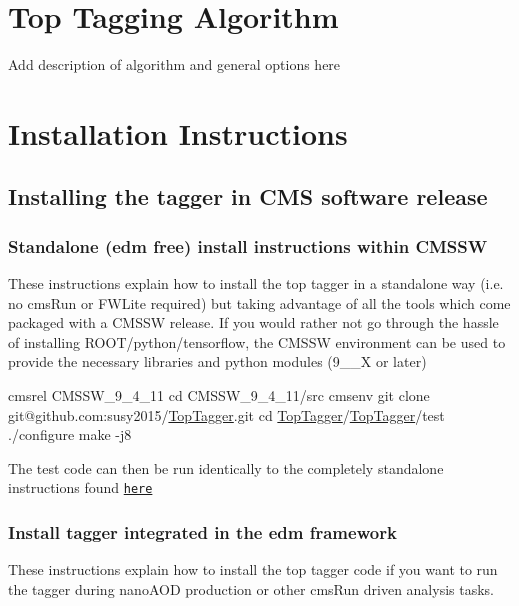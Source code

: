\section*{Top Tagging Algorithm}

Add description of algorithm and general options here

\section*{Installation Instructions}

\subsection*{Installing the tagger in C\-M\-S software release}

\subsubsection*{Standalone (edm free) install instructions within C\-M\-S\-S\-W}

These instructions explain how to install the top tagger in a standalone way (i.\-e. no cms\-Run or F\-W\-Lite required) but taking advantage of all the tools which come packaged with a C\-M\-S\-S\-W release. If you would rather not go through the hassle of installing R\-O\-O\-T/python/tensorflow, the C\-M\-S\-S\-W environment can be used to provide the necessary libraries and python modules (9\-\_\-\_\-\-X or later)


\begin{DoxyCode}
cmsrel CMSSW\_9\_4\_11
cd CMSSW\_9\_4\_11/src
cmsenv
git clone git@github.com:susy2015/\hyperlink{classTopTagger}{TopTagger}.git
cd \hyperlink{classTopTagger}{TopTagger}/\hyperlink{classTopTagger}{TopTagger}/test
./configure
make -j8 
\end{DoxyCode}


The test code can then be run identically to the completely standalone instructions found \href{../README.md#running-the-example}{\tt here}

\subsubsection*{Install tagger integrated in the edm framework}

These instructions explain how to install the top tagger code if you want to run the tagger during nano\-A\-O\-D production or other cms\-Run driven analysis tasks.

